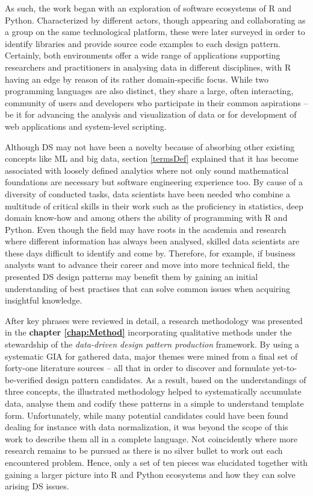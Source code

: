 As such, the work began with an exploration of software ecosystems of R and Python.
Characterized by different actors, though appearing and collaborating as a group on the same technological platform, these were later surveyed in order to identify libraries and provide source code examples to each design pattern. 
Certainly, both environments offer a wide range of applications supporting researchers and practitioners in analysing data in different disciplines, with R having an edge by reason of its rather domain-specific focus. 
While two programming languages are also distinct, they share a large, often interacting, community of users and developers who participate in their common aspirations -- be it for advancing the analysis and visualization of data or for development of web applications and system-level scripting. 

Although \ac{DS} may not have been a novelty because of absorbing other existing concepts like \ac{ML} and big data, section \ref{termsDef} explained that it has become associated with loosely defined analytics where not only sound mathematical foundations are necessary but software engineering experience too.
By cause of a diversity of conducted tasks, data scientists have been needed who combine a multitude of critical skills in their work such as the proficiency in statistics, deep domain know-how and among others the ability of programming with R and Python. 
Even though the field may have roots in the academia and research where different information has always been analysed, skilled data scientists are these days difficult to identify and come by.
Therefore, for example, if business analysts want to advance their career and move into more technical field, the presented \ac{DS} design patterns may benefit them by gaining an initial understanding of best practises that can solve common issues when acquiring insightful knowledge. 

After key phrases were reviewed in detail, a research methodology was presented in the \textbf{chapter \ref{chap:Method}} incorporating qualitative methods under the stewardship of the \emph{data-driven design pattern production} framework.
By using a systematic \ac{GIA} for gathered data, major themes were mined from a final set of forty-one literature sources -- all that in order to discover and formulate yet-to-be-verified design pattern candidates.
As a result, based on the understandings of three concepts, the illustrated methodology helped to systematically accumulate data, analyse them and codify these patterns in a simple to understand template form.
Unfortunately, while many potential candidates could have been found dealing for instance with data normalization, it was beyond the scope of this work to describe them all in a complete language.  
Not coincidently where more research remains to be pursued as there is no silver bullet to work out each encountered problem.
Hence, only a set of ten pieces was elucidated together with gaining a larger picture into R and Python ecosystems and how they can solve arising \ac{DS} issues. 

